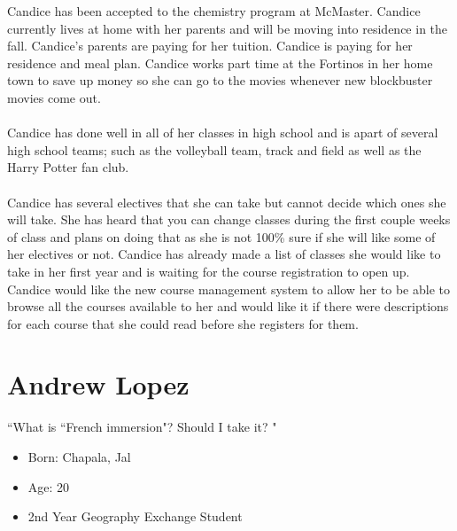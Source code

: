 \documentclass[10pt]{article}
\begin{document}
Candice has been accepted to the chemistry program at McMaster. Candice currently lives at home with her parents and will be moving into residence in the fall. Candice's parents are paying for her tuition. Candice is paying for her residence and meal plan. Candice works part time at the Fortinos in her home town to save up money so she can go to the movies whenever new blockbuster movies come out.\\ \\
Candice has done well in all of her classes in high school and is apart of several high school teams; such as the volleyball team, track and field as well as the Harry Potter fan club.\\  \\
Candice has several electives that she can take but cannot decide which ones she will take. She has heard that you can change classes during the first couple weeks of class and plans on doing that as she is not 100\% sure if she will like some of her electives or not. Candice has already made a list of classes she would like to take in her first year and is waiting for the course registration to open up. Candice would like the new course management system to allow her to be able to browse all the courses available to her and would like it if there were descriptions for each course that she could read before she registers for them.


\newpage

\section{Andrew Lopez}
\begin{minipage}{0.5\textwidth}
\begin{center}
``What is  ``French immersion"? Should I take it? "
\end{center}
\end{minipage}\hfill
\begin{minipage}{0.45\textwidth}
\begin{itemize}
\item Born: Chapala, Jal
\item Age: 20
\item 2nd Year Geography Exchange Student
\end{itemize}
\end{minipage}\\ \\ \\
\end{document}

